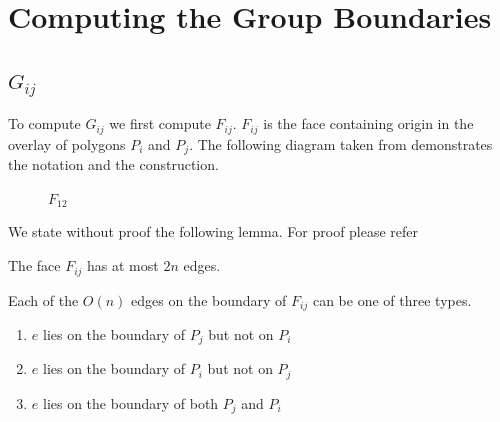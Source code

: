 \chapter{Computing the Group Boundaries}

\section{$G_{ij}$}

To compute $G_{ij}$ we first compute $F_{ij}$. $F_{ij}$ is the face containing origin in the overlay of polygons $P_{i}$ and $P_{j}$.
The following diagram taken from \cite{key1} demonstrates the notation and the construction.

\begin{figure}[h]
\begin{center}
\caption{\label{fig:Construction}$F_{12}$}
\end{center}
\end{figure}

We state without proof the following lemma. For proof please refer \cite{key1}
\begin{lemma}
 The face $F_{ij}$ has at most $2n$ edges.
\end{lemma}

Each of the $O(n)$ edges on the boundary of $F_{ij}$ can be one of three types.
\begin{enumerate}
 \item 
$e$ lies on the boundary of $P_{j}$ but not on $P_{i}$
 \item 
$e$ lies on the boundary of $P_{i}$ but not on $P_{j}$
 \item 
$e$ lies on the boundary of both $P_{j}$ and $P_{i}$

\end{enumerate}

